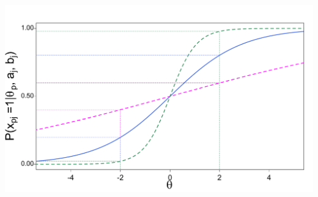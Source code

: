 \documentclass{beamer} %
\begin{document}
\begin{frame}
\begin{overprint}
\includegraphics[width=\linewidth]{img/itemC}		
	\end{overprint}
	
\end{frame}
\end{document}
